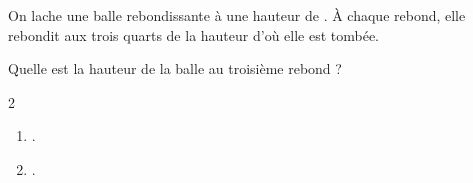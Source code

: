 \begin{exercice*}[Rebonds]
    On lache une balle rebondissante à une hauteur de . À chaque rebond,
    elle rebondit aux trois quarts de la hauteur d'où elle est tombée.

    Quelle est la hauteur de la balle au troisième rebond ?
\end{exercice*}
\begin{corrige}
    \phantom{rrr}    
    \begin{multicols}2
        \begin{enumerate}
            \item .
            \item .
        \end{enumerate}
    \end{multicols}
\end{corrige}

